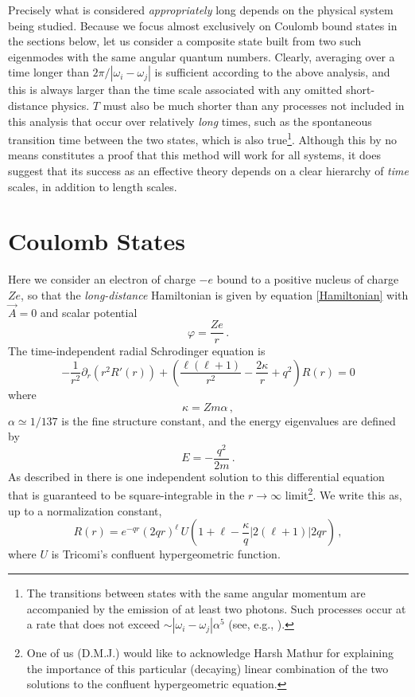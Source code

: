 \documentclass[pra,twocolumn,nofootinbib, superscriptaddress]{revtex4}%
\def\sec#1{\section{#1} }
\def\({\left(}
\def\){\right)}
\def\a{\alpha}
\def\f#1#2{\frac{#1}{#2}}
\def\d{\partial}
\def\k{\kappa}
\def\o{\omega}
\providecommand{\abs}[1]{\left\lvert#1\right\rvert}
\begin{document}
Precisely what is considered \emph{appropriately} long depends on the physical system being studied. Because we focus almost exclusively on Coulomb bound states in the sections below, let us consider a composite state built from two such eigenmodes with the same angular quantum numbers. Clearly, averaging over a time longer than $2\pi/\abs{\o_i-\o_j}$ is sufficient according to the above analysis, and this is always  larger than the time scale associated with any omitted short-distance physics. $T$ must also be much shorter than any processes not included in this analysis that occur over relatively \emph{long} times, such as the spontaneous transition time between the two states, which is also true\footnote{%
The transitions between states with the same angular momentum are accompanied by the emission of at least two photons. Such processes occur at a rate that does not exceed $\sim \abs{\o_i-\o_j}\a^5$ (see, e.g., \cite{Fitzpatrick_Quantum}).}. Although this by no means constitutes a proof that this method will work for all systems, it does suggest that its success as an effective theory depends on a clear hierarchy of \emph{time} scales, in addition to length scales.








\sec{Coulomb States}\label{BoundCoulombStates}

Here we consider an electron of charge $-e$ bound to a positive nucleus of charge $Ze$, so that the \emph{long-distance} Hamiltonian is given by equation \eqref{Hamiltonian} with $\vec{A}=0$ and scalar potential
\begin{equation}
\varphi = \f{Ze}{r}\,.
\end{equation}
The time-independent radial Schrodinger equation is
\begin{equation}
-\f{1}{r^2}\d_r \(r^2 R'(r)\) +\(\f{\ell\(\ell+1\)}{r^2}  -\f{2\k}{r} + q^2\)R(r) =0
\end{equation}
where 
\begin{equation}
\k=Zm\a\,,
\end{equation}
 $\a\simeq1/137$ is the fine structure constant,  and the energy eigenvalues are defined by
\begin{equation}\label{Energy_def}
E=-\f{q^2}{2m}\,.
\end{equation}
As described in \cite{Jacobs:2015han} there is one independent solution to this differential equation that is guaranteed to be square-integrable in the $r\to \infty$ limit\footnote{One of us (D.M.J.) would like to acknowledge Harsh Mathur for explaining the importance of this particular (decaying) linear combination of the two solutions to the confluent hypergeometric equation.}. We write this as, up to a normalization constant,
\begin{equation}\label{Exterior_Solution}
R(r) = e^{-qr} \(2qr\)^\ell \, U\(1+\ell -\f{\k}{q} \Big| 2(\ell+1) \Big| 2qr\)  \,,
\end{equation}
where $U$ is Tricomi's confluent hypergeometric function.
\end{document}
